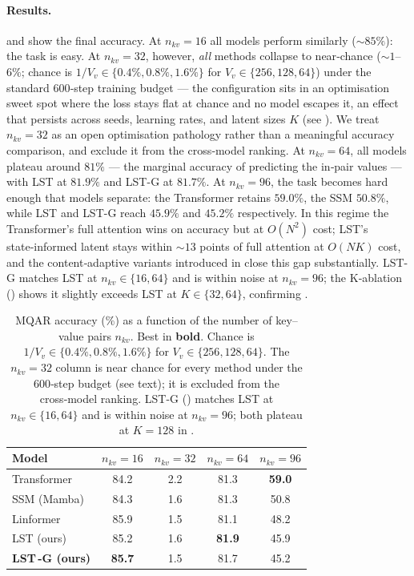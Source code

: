 \documentclass[10pt,twocolumn,letterpaper]{article}
\newcommand{\LST}{\textsc{LST}}
\newcommand{\LSTG}{\textsc{LST\,}-\textsc{G}}
\begin{document}
\paragraph{Results.}   and  show the final accuracy.  At $n_{kv}\!=\!16$ all models perform similarly ($\sim\!85\%$): the task is easy.  At $n_{kv}\!=\!32$, however, \emph{all} methods collapse to near‑chance ($\sim\!1$--$6\%$; chance is $1/V_v\!\in\!\{0.4\%,0.8\%,1.6\%\}$ for $V_v\!\in\!\{256,128,64\}$) under the standard $600$‑step training budget --- the configuration sits in an optimisation sweet spot where the loss stays flat at chance and no model escapes it, an effect that persists across seeds, learning rates, and latent sizes $K$ (see ).  We treat $n_{kv}\!=\!32$ as an open optimisation pathology rather than a meaningful accuracy comparison, and exclude it from the cross‑model ranking.  At $n_{kv}\!=\!64$, all models plateau around $81\%$ --- the marginal accuracy of predicting the in‑pair values --- with \LST{} at $81.9\%$ and \LST-G{} at $81.7\%$.  At $n_{kv}\!=\!96$, the task becomes hard enough that models separate: the Transformer retains $59.0\%$, the SSM $50.8\%$, while \LST{} and \LST-G{} reach $45.9\%$ and $45.2\%$ respectively.  In this regime the Transformer's full attention wins on accuracy but at $O(N^2)$ cost; \LST{}'s state‑informed latent stays within $\sim\!13$ points of full attention at $O(NK)$ cost, and the content‑adaptive variants introduced in  close this gap substantially.  \LST-G{} matches \LST{} at $n_{kv}\!\in\!\{16,64\}$ and is within noise at $n_{kv}\!=\!96$; the K‑ablation () shows it slightly exceeds \LST{} at $K\!\in\!\{32,64\}$, confirming .

\begin{table}[t]
\centering
\caption{MQAR accuracy (\%) as a function of the number of key--value pairs $n_{kv}$.  Best in \textbf{bold}.  Chance is $1/V_v\!\in\!\{0.4\%,0.8\%,1.6\%\}$ for $V_v\!\in\!\{256,128,64\}$.  The $n_{kv}\!=\!32$ column is near chance for every method under the $600$‑step budget (see text); it is excluded from the cross‑model ranking.  \LST-G{} () matches \LST{} at $n_{kv}\!\in\!\{16,64\}$ and is within noise at $n_{kv}\!=\!96$; both plateau at $K\!=\!128$ in .}
\label{tab:mqar}
\small
\begin{tabular}{lcccc}
\toprule
Model & $n_{kv}\!=\!16$ & $n_{kv}\!=\!32$ & $n_{kv}\!=\!64$ & $n_{kv}\!=\!96$ \\
\midrule
Transformer & 84.2 & 2.2 & 81.3 & \textbf{59.0} \\
SSM (Mamba) & 84.3 & 1.6 & 81.3 & 50.8 \\
Linformer & 85.9 & 1.5 & 81.1 & 48.2 \\
\LST{} (ours) & 85.2 & 1.6 & \textbf{81.9} & 45.9 \\
\textbf{\LSTG{} (ours)} & \textbf{85.7} & 1.5 & 81.7 & 45.2 \\
\bottomrule
\end{tabular}
\end{table}
\end{document}

